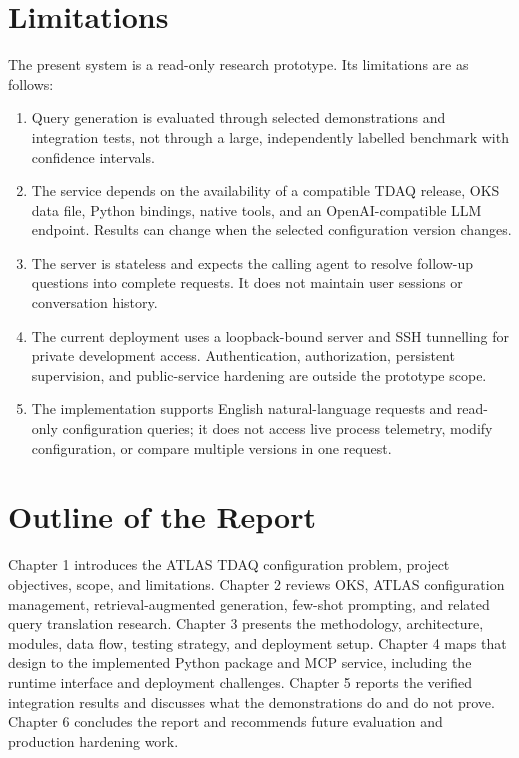 \documentclass[12pt, a4paper]{report}
\begin{document}
\section{Limitations}
The present system is a read-only research prototype. Its limitations are as
follows:
\begin{enumerate}[label=(\roman*)]
  \item Query generation is evaluated through selected demonstrations and
  integration tests, not through a large, independently labelled benchmark
  with confidence intervals.
  \item The service depends on the availability of a compatible TDAQ release,
  OKS data file, Python bindings, native tools, and an OpenAI-compatible LLM
  endpoint. Results can change when the selected configuration version changes.
  \item The server is stateless and expects the calling agent to resolve
  follow-up questions into complete requests. It does not maintain user
  sessions or conversation history.
  \item The current deployment uses a loopback-bound server and SSH tunnelling
  for private development access. Authentication, authorization, persistent
  supervision, and public-service hardening are outside the prototype scope.
  \item The implementation supports English natural-language requests and
  read-only configuration queries; it does not access live process telemetry,
  modify configuration, or compare multiple versions in one request.
\end{enumerate}

\section{Outline of the Report}
Chapter 1 introduces the ATLAS TDAQ configuration problem, project objectives,
scope, and limitations. Chapter 2 reviews OKS, ATLAS configuration management,
retrieval-augmented generation, few-shot prompting, and related query
translation research. Chapter 3 presents the methodology, architecture,
modules, data flow, testing strategy, and deployment setup. Chapter 4 maps
that design to the implemented Python package and MCP service, including the
runtime interface and deployment challenges. Chapter 5 reports the verified
integration results and discusses what the demonstrations do and do not prove.
Chapter 6 concludes the report and recommends future evaluation and production
hardening work.
\end{document}
